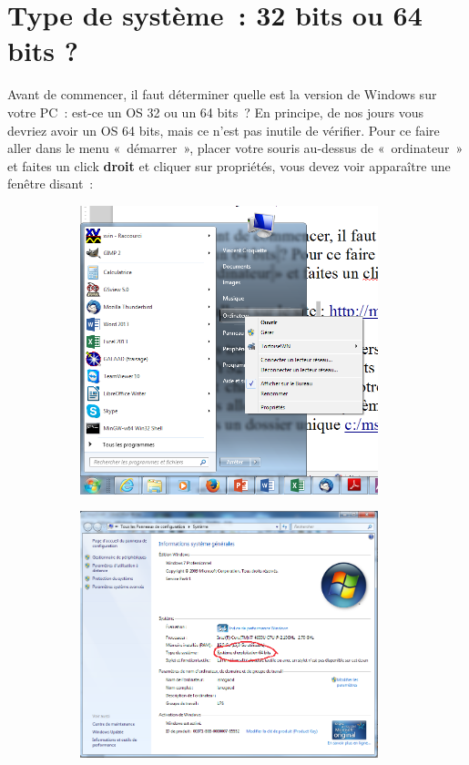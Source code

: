 \documentclass{article}
\begin{document}
 \section{Type de système : 32 bits ou 64 bits ?}
 Avant de commencer, il faut déterminer quelle est la version de Windows sur votre PC : est-ce un OS 32 ou un 64 bits ? En principe, de nos jours vous devriez avoir un OS 64 bits, mais ce n'est pas inutile de vérifier. Pour ce faire aller dans le menu « démarrer », placer votre souris au-dessus de « ordinateur » et faites un click \textbf{droit} et cliquer sur propriétés, vous devez voir apparaître une fenêtre disant :
 \begin{figure}[H]
\begin{subfigure}[c]{0.5\textwidth}
\includegraphics[width=0.95\textwidth]{Plots/Pic1.png}
\end{subfigure}
\begin{subfigure}[c]{0.5\textwidth}
\includegraphics[width=0.95\textwidth]{Plots/Pic2.png}

\end{subfigure}
\end{figure}
\end{document}
